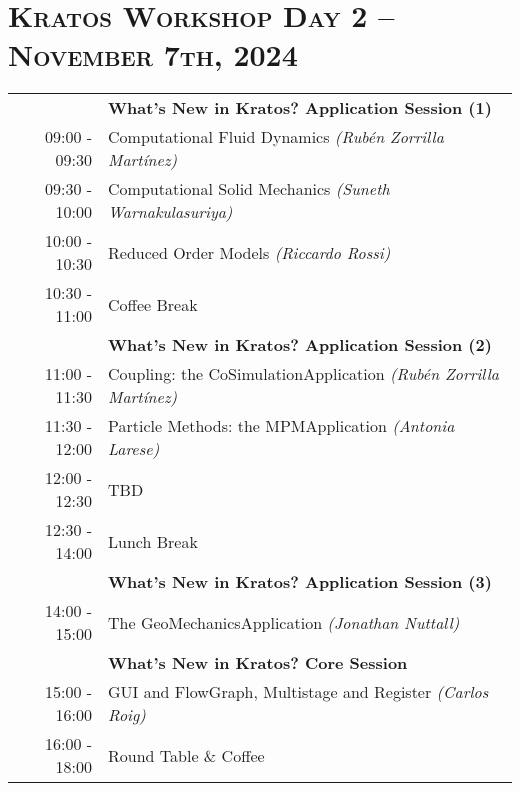 \documentclass{article}
\begin{document}
\newpage
\section*{\centering \textsc{Kratos Workshop Day 2 -- November 7th, 2024}}

\begin{table}[h]\centering
   \begin{tabularx}{0.85\textwidth}{r|X}
      \toprule%
                    & {\large \textbf{What's New in Kratos? Application Session (1)}} \\%
      09:00 - 09:30 & Computational Fluid Dynamics \textit{(Rubén Zorrilla Martínez)}\\%
      09:30 - 10:00 & Computational Solid Mechanics \textit{(Suneth Warnakulasuriya)}\\%
      10:00 - 10:30 & Reduced Order Models \textit{(Riccardo Rossi)}\\%
      \midrule%
      \rowcolor{SeaGreen3!5!} 10:30 - 11:00 & Coffee Break \\%
      \midrule%
                    & {\large \textbf{What's New in Kratos? Application Session (2)}} \\%
      11:00 - 11:30 & Coupling: the CoSimulationApplication \textit{(Rubén Zorrilla Martínez)}\\%
      11:30 - 12:00 & Particle Methods: the MPMApplication \textit{(Antonia Larese)}\\%
      12:00 - 12:30 & TBD \\%
      \midrule%
      \rowcolor{SeaGreen3!5!} 12:30 - 14:00 & Lunch Break \\%
      \midrule%
                    & {\large \textbf{What's New in Kratos? Application Session (3)}} \\%
      14:00 - 15:00 & The GeoMechanicsApplication \textit{(Jonathan Nuttall)}\\%
      \midrule%
                    & {\large \textbf{What's New in Kratos? Core Session}} \\%
      15:00 - 16:00 & GUI and FlowGraph, Multistage and Register \textit{(Carlos Roig)}\\%
      \midrule%
      \rowcolor{SeaGreen3!5!} 16:00 - 18:00 & Round Table \& Coffee \\%
      \bottomrule
   \end{tabularx}
\end{table}
\end{document}
